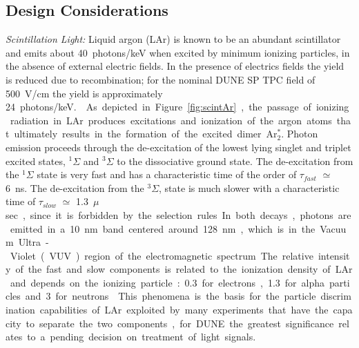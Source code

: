\subsection{Design Considerations}
\label{sec:fdsp-pd-des-consid}

\emph{Scintillation Light:} Liquid argon (LAr) is known to be an abundant scintillator and emits about \SI{40}{photons/keV} when excited  by minimum ionizing particles\cite{Doke:1990rza},
in the absence of external electric fields. In the presence of electrics fields the yield is reduced due to recombination; for the nominal DUNE SP TPC field of \SI{500}{V/cm} the yield is approximately \SI{24}{photons/keV.}\cite{PhysRevB.20.3486}. 

As depicted in Figure~\ref{fig:scintAr}, the passage of ionizing radiation in LAr produces excitations and ionization of the argon atoms that ultimately results in the formation of the excited dimer Ar$^*_2$.  
Photon emission proceeds through the de-excitation of the lowest lying singlet and triplet excited states, $^{1}\Sigma$ and 
$^{3}\Sigma$ to the dissociative ground state. The de-excitation from the $^{1}\Sigma$ state is very fast and has a characteristic time of the order of 
$\tau_{fast}$ $\simeq$ \SI{6}{ns}. The de-excitation from the $^{3}\Sigma$, state is much slower with a characteristic time of $\tau_{slow}$ $\simeq$ \SI{1.3}{$\mu$sec}, since it is forbidden by the selection rules. 
In both decays, photons are emitted in a \SI{10}{nm} band centered around \SI{128}{nm}, which is in the Vacuum Ultra-Violet (VUV) region of the electromagnetic spectrum.
The relative intensity of the  fast and slow components is related to the ionization density of LAr and depends on the ionizing particle: \num{0.3} for electrons, \num{1.3} for alpha particles and \num{3} for neutrons\cite{PhysRevB.27.5279}.
This phenomena is the basis for the  particle discrimination capabilities of LAr exploited by many experiments that have the capacity to separate the two components, for DUNE the greatest significance relates to a pending decision on treatment of light signals.

